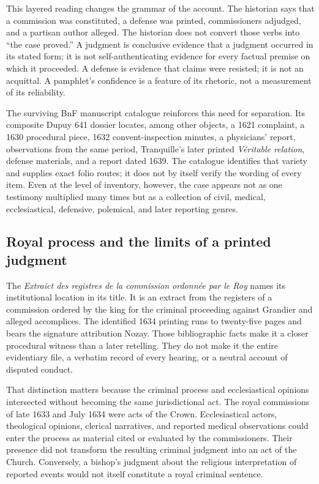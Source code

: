 This layered reading changes the grammar of the account.  The historian says
that a commission was constituted, a defense was printed, commissioners
adjudged, and a partisan author alleged.  The historian does not convert those
verbs into ``the case proved.''  A judgment is conclusive evidence that a
judgment occurred in its stated form; it is not self-authenticating evidence
for every factual premise on which it proceeded.  A defense is evidence that
claims were resisted; it is not an acquittal.  A pamphlet's confidence is a
feature of its rhetoric, not a measurement of its reliability.

The surviving BnF manuscript catalogue reinforces this need for separation.
Its composite Dupuy 641 dossier locates, among other objects, a 1621 complaint,
a 1630 procedural piece, 1632 convent-inspection minutes, a physicians'
report, observations from the same period, Tranquille's later printed
\emph{Véritable relation}, defense materials, and a report dated 1639.  The
catalogue identifies that variety and supplies exact folio routes; it does not
by itself verify the wording of every item.  Even at the level of inventory,
however, the case appears not as one testimony multiplied many times but as a
collection of civil, medical, ecclesiastical, defensive, polemical, and later
reporting genres.

\subsection{Royal process and the limits of a printed judgment}

The \emph{Extraict des registres de la commission ordonnée par le Roy} names
its institutional location in its title.  It is an extract from the registers
of a commission ordered by the king for the criminal proceeding against
Grandier and alleged accomplices.  The identified 1634 printing runs to
twenty-five pages and bears the signature attribution Nozay.  Those
bibliographic facts make it a closer procedural witness than a later
retelling.  They do not make it the entire evidentiary file, a verbatim record
of every hearing, or a neutral account of disputed conduct.

That distinction matters because the criminal process and ecclesiastical
opinions intersected without becoming the same jurisdictional act.  The royal
commissions of late 1633 and July 1634 were acts of the Crown.  Ecclesiastical
actors, theological opinions, clerical narratives, and reported medical
observations could enter the process as material cited or evaluated by the
commissioners.  Their presence did not transform the resulting criminal
judgment into an act of the Church.  Conversely, a bishop's judgment about the
religious interpretation of reported events would not itself constitute a
royal criminal sentence.

